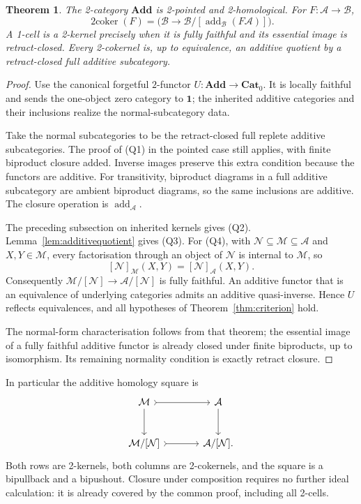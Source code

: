 \documentclass[11pt,reqno,a4paper]{amsart}
\newtheorem{theorem}{Theorem}[section]
\theoremstyle{definition}
\theoremstyle{remark}
\newcommand{\A}{\mathcal{A}}
\newcommand{\M}{\mathcal{M}}
\newcommand{\N}{\mathcal{N}}
\newcommand{\0}{\mathbf{0}}
\renewcommand{\1}{\mathbf{1}}
\newcommand{\Pt}{\mathbf{Cat}_{0}}
\newcommand{\Add}{\mathbf{Add}}
\newcommand{\B}{\mathcal B}
\newcommand{\twocoker}{\operatorname{2coker}}
\newcommand{\aq}[2]{#1/[#2]}
\DeclareMathOperator{\add}{add}
\begin{document}
\begin{theorem}\label{thm:additive}
The 2-category $\Add$ is 2-pointed and 2-homological. For
$F:\A\to\B$,
\begin{equation}\label{eq:additivecoker}
 \twocoker(F)=
 \bigl(\B\longrightarrow\aq{\B}{\add_{\B}(F\A)}\bigr).
\end{equation}
A 1-cell is a 2-kernel precisely when it is fully faithful and its
essential image is retract-closed. Every 2-cokernel is, up to equivalence,
an additive quotient by a retract-closed full additive subcategory.
\end{theorem}
\begin{proof}
Use the canonical forgetful $2$-functor $U:\Add\to\Pt$.
It is locally faithful and sends the one-object zero category
to $\mathbf1$; the inherited additive categories and their
inclusions realize the normal-subcategory data.

Take the normal subcategories to be the retract-closed full replete
additive subcategories. The proof of (Q1) in the pointed case still
applies, with finite biproduct closure added. Inverse images preserve
this extra condition because the functors are additive. For transitivity,
biproduct diagrams in a full additive subcategory are ambient biproduct
diagrams, so the same inclusions are additive. The closure operation
is $\add_{\A}$.

The preceding subsection on inherited kernels gives (Q2).
Lemma~\ref{lem:additivequotient} gives (Q3). For (Q4), with
$\N\subseteq\M\subseteq\A$ and $X,Y\in\M$, every factorisation
through an object of $\N$ is internal to $\M$, so
\begin{equation}\label{eq:addrestriction}
 [\N]_{\M}(X,Y)=[\N]_{\A}(X,Y).
\end{equation}
Consequently $\aq{\M}{\N}\to\aq{\A}{\N}$ is fully faithful.
An additive functor that is an equivalence of underlying
categories admits an additive quasi-inverse. Hence $U$ reflects
equivalences, and all hypotheses of Theorem~\ref{thm:criterion}
hold.

The normal-form characterisation follows from that theorem; the
essential image of a fully faithful additive functor is already closed
under finite biproducts, up to isomorphism. Its remaining normality
condition is exactly retract closure.
\end{proof}

In particular the additive homology square is
\begin{equation}\label{eq:additivesquare}
\begin{tikzcd}[column sep=large,row sep=large]
 \M\arrow[r,tail]\arrow[d] & \A\arrow[d]\\
 \aq{\M}{\N}\arrow[r,tail] & \aq{\A}{\N}.
\end{tikzcd}
\end{equation}
Both rows are 2-kernels, both columns are 2-cokernels, and the square
is a bipullback and a bipushout. Closure under composition requires
no further ideal calculation: it is already covered by the common
proof, including all 2-cells.
\end{document}
